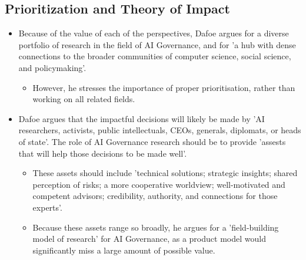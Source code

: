 \documentclass{article}
\begin{document}
\begin{multicols}{2}
\section{Prioritization and Theory of Impact}
\begin{itemize}
    \item Because of the value of each of the perspectives, Dafoe argues for a diverse portfolio of research in the field of AI Governance, and for 'a hub with dense connections to the broader communities of computer science, social science, and policymaking'.
    \begin{itemize}
        \item However, he stresses the importance of proper prioritisation, rather than working on all related fields.
    \end{itemize}
    \item Dafoe argues that the impactful decisions will likely be made by 'AI researchers, activists, public intellectuals, CEOs, generals, diplomats, or heads of state'. The role of AI Governance research should be to provide 'assests that will help those decisions to be made well'.
    \begin{itemize}
        \item These assets should include 'technical solutions; strategic insights; shared perception of risks; a more cooperative worldview; well-motivated and competent advisors; credibility, authority, and connections for those experts'.
        \item Because these assets range so broadly, he argues for a 'field-building model of research' for AI Governance, as a product model would significantly miss a large amount of possible value.
    \end{itemize}
\end{itemize}

\end{multicols}
\end{document}
